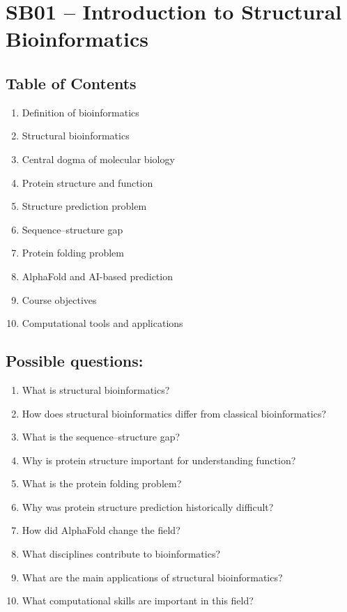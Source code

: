\section{SB01 -- Introduction to Structural Bioinformatics}

\subsection*{Table of Contents}
\begin{enumerate}
\item Definition of bioinformatics
\item Structural bioinformatics
\item Central dogma of molecular biology
\item Protein structure and function
\item Structure prediction problem
\item Sequence--structure gap
\item Protein folding problem
\item AlphaFold and AI-based prediction
\item Course objectives
\item Computational tools and applications
\end{enumerate}


\subsection*{Possible questions:}
\begin{enumerate}
\item{What is structural bioinformatics?}
\item{How does structural bioinformatics differ from classical bioinformatics?}
\item{What is the sequence--structure gap?}
\item{Why is protein structure important for understanding function?}
\item{What is the protein folding problem?}
\item{Why was protein structure prediction historically difficult?}
\item{How did AlphaFold change the field?}
\item{What disciplines contribute to bioinformatics?}
\item{What are the main applications of structural bioinformatics?}
\item{What computational skills are important in this field?}
\end{enumerate}